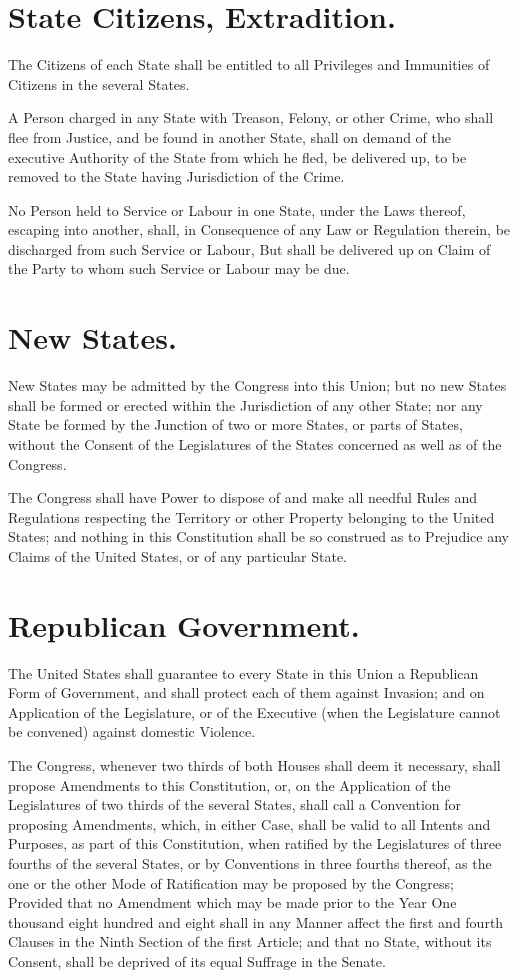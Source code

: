 \documentclass[12pt]{constitution}
\begin{document}
\section{State Citizens, Extradition.}
The Citizens of each State shall be entitled to all Privileges and Immunities
of Citizens in the several States.

A Person charged in any State with Treason, Felony, or other Crime, who shall
flee from Justice, and be found in another State, shall on demand of the
executive Authority of the State from which he fled, be delivered up, to be
removed to the State having Jurisdiction of the Crime.

No Person held to Service or Labour in one State, under the Laws thereof,
escaping into another, shall, in Consequence of any Law or Regulation therein,
be discharged from such Service or Labour, But shall be delivered up on Claim
of the Party to whom such Service or Labour may be due.


\section{New States.}
New States may be admitted by the Congress into this Union; but no new States
shall be formed or erected within the Jurisdiction of any other State; nor any
State be formed by the Junction of two or more States, or parts of States,
without the Consent of the Legislatures of the States concerned as well as of
the Congress.

The Congress shall have Power to dispose of and make all needful Rules and
Regulations respecting the Territory or other Property belonging to the United
States; and nothing in this Constitution shall be so construed as to Prejudice
any Claims of the United States, or of any particular State.


\section{Republican Government.}
The United States shall guarantee to every State in this Union a Republican
Form of Government, and shall protect each of them against Invasion; and on
Application of the Legislature, or of the Executive (when the Legislature
cannot be convened) against domestic Violence.




The Congress, whenever two thirds of both Houses shall deem it necessary, shall
propose Amendments to this Constitution, or, on the Application of the
Legislatures of two thirds of the several States, shall call a Convention for
proposing Amendments, which, in either Case, shall be valid to all Intents and
Purposes, as part of this Constitution, when ratified by the Legislatures of
three fourths of the several States, or by Conventions in three fourths
thereof, as the one or the other Mode of Ratification may be proposed by the
Congress; Provided that no Amendment which may be made prior to the Year One
thousand eight hundred and eight shall in any Manner affect the first and
fourth Clauses in the Ninth Section of the first Article; and that no State,
without its Consent, shall be deprived of its equal Suffrage in the Senate.
\end{document}
